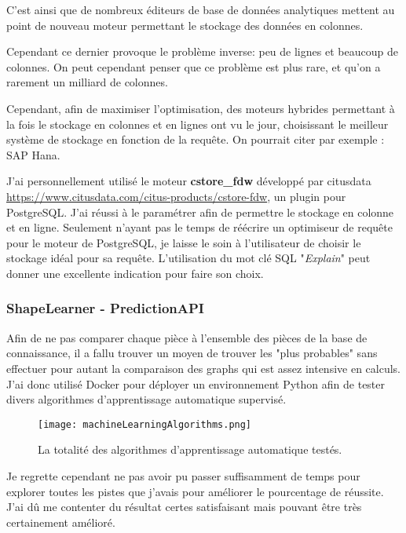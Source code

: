 C'est ainsi que de nombreux éditeurs de base de données analytiques mettent au point de nouveau moteur permettant le stockage des données en colonnes.

Cependant ce dernier provoque le problème inverse: peu de lignes et beaucoup de colonnes. On peut cependant penser que ce problème est plus rare, et qu'on a rarement un milliard de colonnes.

Cependant, afin de maximiser l'optimisation, des moteurs hybrides permettant à la fois le stockage en colonnes et en lignes ont vu le jour, choisissant le meilleur système de stockage en fonction de la requête. On pourrait citer par exemple : SAP Hana.

J'ai personnellement utilisé le moteur \textbf{cstore\_fdw} développé par citusdata \url{https://www.citusdata.com/citus-products/cstore-fdw}, un plugin pour PostgreSQL. J'ai réussi à le paramétrer afin de permettre le stockage en colonne et en ligne. Seulement n'ayant pas le temps de réécrire un optimiseur de requête pour le moteur de PostgreSQL, je laisse le soin à l'utilisateur de choisir le stockage idéal pour sa requête. L'utilisation du mot clé SQL "\textit{Explain}" peut donner une excellente indication pour faire son choix.


\subsubsection{ShapeLearner - PredictionAPI}
\label{subsec:PredictionAPI}

Afin de ne pas comparer chaque pièce à l'ensemble des pièces de la base de connaissance, il a fallu trouver un moyen de trouver les "plus probables" sans effectuer pour autant la comparaison des graphs qui est assez intensive en calculs.\\

J'ai donc utilisé Docker pour déployer un environnement Python afin de tester divers algorithmes d'apprentissage automatique supervisé.

 \begin{figure}[H]
    \centering
    \texttt{[image: machineLearningAlgorithms.png]}
	\caption{La totalité des algorithmes d'apprentissage automatique testés.}\label{image.MLListe} 
\end{figure}

Je regrette cependant ne pas avoir pu passer suffisamment de temps pour explorer toutes les pistes que j'avais pour améliorer le pourcentage de réussite. J'ai dû me contenter du résultat certes satisfaisant mais pouvant être très certainement amélioré.

